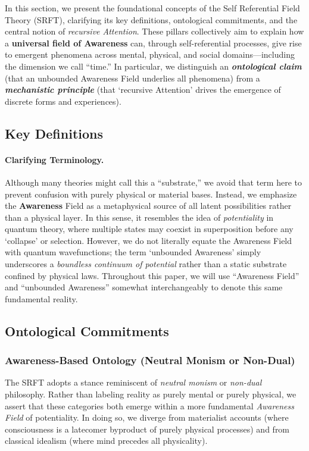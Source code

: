 \documentclass[12pt,a4paper]{article}
\begin{document}
In this section, we present the foundational concepts of the Self Referential Field Theory (SRFT), clarifying its key definitions, ontological commitments, and the central notion of \emph{recursive Attention}. These pillars collectively aim to explain how a \textbf{universal field of Awareness} can, through self-referential processes, give rise to emergent phenomena across mental, physical, and social domains---including the dimension we call ``time.'' In particular, we distinguish an \textbf{\emph{ontological claim}} (that an unbounded Awareness Field underlies all phenomena) from a \textbf{\emph{mechanistic principle}} (that `recursive Attention' drives the emergence of discrete forms and experiences).


\subsection{Key Definitions}
\label{subsec:key-defs}

\paragraph{Clarifying Terminology.} 
Although many theories might call this a “substrate,” we avoid that term here to prevent confusion with purely physical or material bases. Instead, we emphasize the \textbf{Awareness} Field as a metaphysical source of all latent possibilities rather than a physical layer. In this sense, it resembles the idea of \emph{potentiality} in quantum theory, where multiple states may coexist in superposition before any ‘collapse’ or selection. However, we do not literally equate the Awareness Field with quantum wavefunctions; the term ‘unbounded Awareness’ simply underscores a \emph{boundless continuum of potential} rather than a static substrate confined by physical laws. Throughout this paper, we will use “Awareness Field” and “unbounded Awareness” somewhat interchangeably to denote this same fundamental reality.


\subsection{Ontological Commitments}
\label{subsec:ontological-commitments}

\subsubsection{Awareness-Based Ontology (Neutral Monism or Non-Dual)}
The SRFT adopts a stance reminiscent of \emph{neutral monism} or \emph{non-dual} philosophy. Rather than labeling reality as purely mental or purely physical, we assert that these categories both emerge within a more fundamental \emph{Awareness Field} of potentiality. In doing so, we diverge from materialist accounts (where consciousness is a latecomer byproduct of purely physical processes) and from classical idealism (where mind precedes all physicality).
\end{document}
